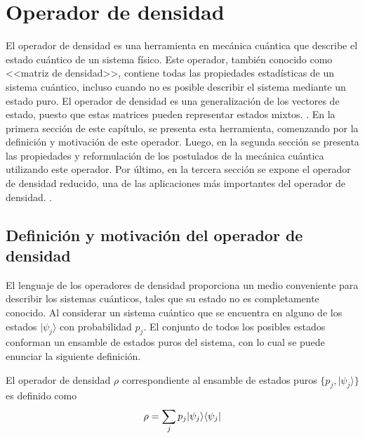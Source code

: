 \chapter{Operador de densidad}\label{OpDensidad}

El operador de densidad es una herramienta en mecánica cuántica que describe el
estado cuántico de un sistema físico. Este operador, también conocido como
<<matriz de densidad>>, contiene todas las propiedades estadísticas de un sistema cuántico, incluso cuando no es posible describir el sistema mediante un estado puro. El operador de densidad es una generalización de los vectores de estado, puesto que estas matrices pueden representar estados mixtos. .  
En la primera sección de este capítulo, se presenta esta herramienta, comenzando por la definición y motivación de este operador. Luego, en la segunda sección  se presenta las propiedades y reformulación de los postulados de la mecánica cuántica utilizando este operador. Por último, en la tercera sección se expone el operador de densidad reducido, una de las aplicaciones más importantes del operador de densidad.
. 



\section{Definición y motivación  del operador de densidad}
El lenguaje de los operadores de densidad proporciona un  medio conveniente para describir los sistemas cuánticos, tales que su estado no es completamente conocido. Al considerar un sistema cuántico que se encuentra en alguno de los estados $|\psi_j \rangle $ con probabilidad $p_j$. El conjunto de todos los posibles estados conforman un ensamble
de estados puros del sistema, con lo cual se puede enunciar la siguiente definición. 

  \begin{definition} El operador de densidad $\rho$ correspondiente al ensamble de estados puros $\{p_j,|\psi_j \rangle \}$ es definido como {\cite{wilde2011classical}}
  	\begin{equation}{\label{defdensityoperator}}
  		\rho=\sum_{j}p_j|\psi_j\rangle \langle \psi_j|
  	\end{equation}
  
  	\end{definition}
  	

